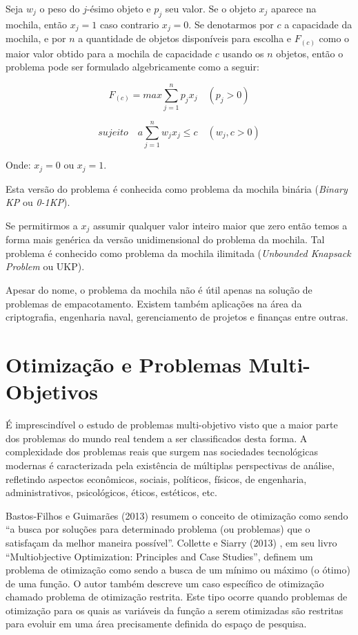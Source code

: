 Seja $w_j$ o peso do $j$-ésimo objeto e $p_j$ seu valor. Se o objeto $x_j$ aparece na mochila, então  $x_j=1$ caso contrario $x_j=0$. Se denotarmos por $c$ a capacidade da mochila, e por $n$ a quantidade de objetos disponíveis para escolha e $F_(c)$ como o maior valor obtido para a mochila de capacidade $c$ usando os $n$ objetos, então o problema pode ser formulado algebricamente como a seguir:

\begin{equation} \label{eq:taco-ret} 
F_{(c)} = max\sum_{j=1}^{n} p_{j}x_{j} \quad (p_{j} > 0 )
\end{equation}

\begin{equation} \label{eq:taco-ret} 
sujeito \quad a\sum_{j=1}^{n} w_{j}x_{j} \leq c \quad (w_{j},c > 0 )
\end{equation}

Onde: $x_j=0$ ou $x_{j}=1$.

Esta versão do problema é conhecida como problema da mochila binária (\textit{Binary KP} ou \textit{0-1KP}).

Se permitirmos a \(x_{j}\) assumir qualquer valor inteiro maior que zero então temos a forma mais genérica da versão unidimensional do problema da mochila. Tal problema é conhecido como problema da mochila ilimitada (\textit{Unbounded Knapsack Problem} ou UKP).

Apesar do nome, o problema da mochila não é útil apenas na solução de problemas de empacotamento. Existem também aplicações na área da criptografia, engenharia naval, gerenciamento de projetos e finanças entre outras.

\section{Otimização e Problemas Multi-Objetivos}
\label{sec-multi}

É imprescindível o estudo de problemas multi-objetivo visto que a maior parte dos problemas do mundo real tendem a ser classificados desta forma. A complexidade dos problemas reais que surgem nas sociedades tecnológicas modernas é caracterizada pela existência de múltiplas perspectivas de análise, refletindo aspectos econômicos, sociais, políticos, físicos, de engenharia, administrativos, psicológicos, éticos, estéticos, etc.

Bastos-Filhos e Guimarães (2013) \cite{bastos2015multi} resumem o conceito de otimização como sendo “a busca por soluções para determinado problema (ou problemas) que o satisfaçam da melhor maneira possível”. Collette e Siarry (2013) \cite{collette2013multiobjective}, em seu livro “Multiobjective Optimization: Principles and Case Studies”, definem um problema de otimização como sendo a busca de um mínimo ou máximo (o ótimo) de uma função. O autor também descreve um caso específico de otimização chamado problema de otimização restrita. Este tipo ocorre quando problemas de otimização para os quais as variáveis da função a serem otimizadas são restritas para evoluir em uma área precisamente definida do espaço de pesquisa.

